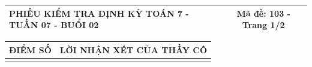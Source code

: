 \documentclass[12pt,a4paper]{article}
\begin{document}
\newpage


\noindent
\begin{tabularx}{\linewidth}{|X|c|}
\hline
\textbf{PHIẾU KIỂM TRA ĐỊNH KỲ TOÁN 7 - TUẦN 07 - BUỔI 02} & \textbf{Mã đề: 103 - Trang 1/2} \\
\hline
\end{tabularx}

\vspace{1.2mm}

\noindent
\begin{tabularx}{\linewidth}{|p{3.2cm}|X|}
\hline
\centering\textbf{ĐIỂM SỐ} & \centering\textbf{LỜI NHẬN XÉT CỦA THẦY CÔ} \tabularnewline
\hline
\rule{0pt}{1.8cm} & \tabularnewline
\hline
\end{tabularx}

\vspace{1.5mm}
\end{document}
